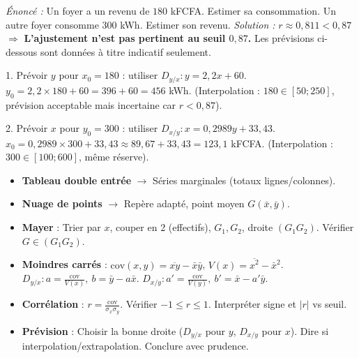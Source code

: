 \documentclass[11pt]{article}
\begin{document}
\begin{exoresolu}
\emph{Énoncé :} Un foyer a un revenu de $180$ kFCFA. Estimer sa consommation. Un autre foyer consomme $300$ kWh. Estimer son revenu.
\tcblower
\emph{Solution :}
$r \approx 0,811 < 0,87$ $\Rightarrow$ \textbf{L'ajustement n'est pas pertinent au seuil $0,87$.} Les prévisions ci-dessous sont données à titre indicatif seulement.

1. Prévoir $y$ pour $x_0=180$ : utiliser $D_{y/x} : y = 2,2x + 60$.
$y_0 = 2,2 \times 180 + 60 = 396 + 60 = 456$ kWh.
(Interpolation : $180 \in [50;250]$, prévision acceptable mais incertaine car $r<0,87$).

2. Prévoir $x$ pour $y_0=300$ : utiliser $D_{x/y} : x = 0,2989y + 33,43$.
$x_0 = 0,2989 \times 300 + 33,43 \approx 89,67 + 33,43 = 123,1$ kFCFA.
(Interpolation : $300 \in [100;600]$, même réserve).
\end{exoresolu}

\begin{aretenir}
\begin{itemize}
  \item \textbf{Tableau double entrée} $\rightarrow$ Séries marginales (totaux lignes/colonnes).
  \item \textbf{Nuage de points} $\rightarrow$ Repère adapté, point moyen $G(\bar{x},\bar{y})$.
  \item \textbf{Mayer} : Trier par $x$, couper en 2 (effectifs), $G_1,G_2$, droite $(G_1G_2)$. Vérifier $G \in (G_1G_2)$.
  \item \textbf{Moindres carrés} : $\mathrm{cov}(x,y)=\overline{xy}-\bar{x}\bar{y}$, $V(x)=\overline{x^2}-\bar{x}^2$.
  $D_{y/x}: a=\frac{\mathrm{cov}}{V(x)},\ b=\bar{y}-a\bar{x}$.
  $D_{x/y}: a'=\frac{\mathrm{cov}}{V(y)},\ b'=\bar{x}-a'\bar{y}$.
  \item \textbf{Corrélation} : $r=\frac{\mathrm{cov}}{\sigma_x\sigma_y}$. Vérifier $-1\le r\le 1$. Interpréter signe et $|r|$ vs seuil.
  \item \textbf{Prévision} : Choisir la bonne droite ($D_{y/x}$ pour $y$, $D_{x/y}$ pour $x$). Dire si interpolation/extrapolation. Conclure avec prudence.
\end{itemize}
\end{aretenir}
\end{document}
